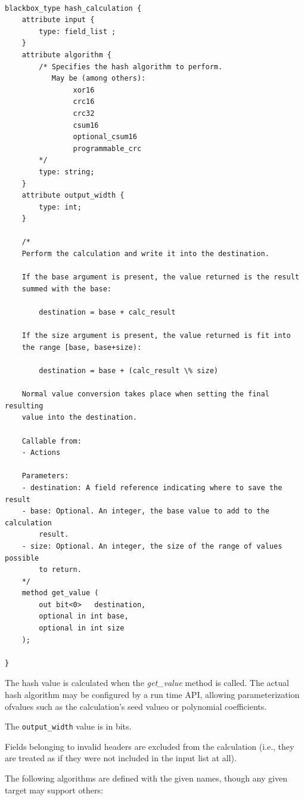 \documentclass[12pt]{article}
\begin{document}
\begin{lstlisting}[style=P4style]

blackbox_type hash_calculation {
    attribute input {
        type: field_list ;
    }
    attribute algorithm {
        /* Specifies the hash algorithm to perform.
           May be (among others):
                xor16
                crc16
                crc32
                csum16
                optional_csum16
                programmable_crc
        */
        type: string;
    }
    attribute output_width {
        type: int;
    }

    /*
    Perform the calculation and write it into the destination.

    If the base argument is present, the value returned is the result
    summed with the base:

        destination = base + calc_result

    If the size argument is present, the value returned is fit into
    the range [base, base+size):

        destination = base + (calc_result \% size)

    Normal value conversion takes place when setting the final resulting
    value into the destination.

    Callable from:
    - Actions

    Parameters:
    - destination: A field reference indicating where to save the result
    - base: Optional. An integer, the base value to add to the calculation
        result.
    - size: Optional. An integer, the size of the range of values possible
        to return.
    */
    method get_value (
        out bit<0>   destination,
        optional in int base,
        optional in int size
    );

}

\end{lstlisting}

The hash value is calculated when the \textit{get_value} method is called. The
actual hash algorithm may be configured by a run time API, allowing
parameterization ofvalues such as the calculation's seed valueo or polynomial
coefficients.

The \texttt{output_width} value is in bits.

Fields belonging to invalid headers are excluded from the calculation (i.e.,
they are treated as if they were not included in the input list at all).

The following algorithms are defined with the given names, though any given
target may support others:
\end{document}
